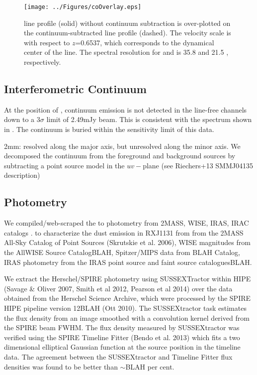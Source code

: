 \documentclass[]{emulateapj}
\begin{document}
\begin{figure}[!Htbp]
\centering
\texttt{[image: ../Figures/coOverlay.eps]}
\caption{
\carma \cco line profile (solid) without continuum subtraction is
over-plotted on the continuum-subtracted \bco line profile (dashed).
The velocity scale is with respect to $z$=0.6537, which corresponds to the dynamical center of the \bco line. The spectral resolution for \cco and \bco is 35.8 \kms and 21.5 \kms, respectively.
 \label{fig:co32spec}}
\end{figure}


\subsection{Interferometric Continuum}

At the position of \cco, continuum emission is not detected in
the line-free channels down to a 3$\sigma$ limit of 2.49mJy beam\pmOne.
This is consistent with the spectrum shown in .
The continuum is buried within the sensitivity limit of this data.



2mm: resolved along the major axis, but unresolved along the minor axis. We decomposed the continuum from the foreground and background sources by subtracting a point
source model in the $uv-$plane (see Riechers+13 SMMJ04135 description)


\subsection{Photometry}
We compiled/web-scraped the \mir to \fir photometry
from 2MASS, WISE, IRAS, IRAC catalogs .
to characterize
the dust emission in RXJ1131 from
from the 2MASS All-Sky Catalog of Point Sources  (Skrutskie et al. 2006), WISE
magnitudes from the AllWISE Source CatalogBLAH, Spitzer/MIPS
data from BLAH Catalog, IRAS photometry from the IRAS point source
and faint source cataloguesBLAH.

We extract the Herschel/SPIRE photometry using SUSSEXTractor
within HIPE (Savage \& Oliver 2007, Smith et al 2012, Pearson et al 2014)
over the data obtained from the Herschel Science Archive, which were
processed by the SPIRE HIPE pipeline version 12BLAH (Ott 2010).
The SUSSEXtractor
task estimates the flux density from an image smoothed with
a convolution kernel derived from the SPIRE beam FWHM.
The flux density measured by SUSSEXtractor
was verified using the SPIRE Timeline Fitter (Bendo et
al. 2013) which fits a two dimensional elliptical Gaussian
function at the source position in the timeline data. The
agreement between the SUSSEXtractor and Timeline Fitter
flux densities was found to be better than $\sim$BLAH per cent.
\end{document}
